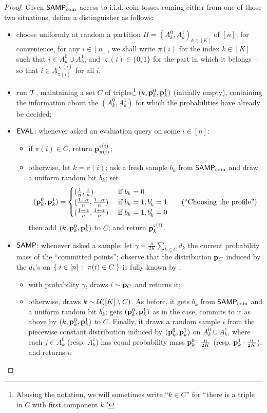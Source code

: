 \begin{proof}
Given ${\sf SAMP}_\text{coin}$ access to i.i.d. coin tosses coming either from one of those two situations, define a distinguisher \Algo as follows:
  \begin{itemize}
    \item choose uniformly at random a partition $\Pi=(A^0_k,A^1_k)_{k\in[K]}$ of $[n]$; for convenience, for any $i\in[n]$, we shall write $\pi(i)$ for the index $k\in[K]$ such that $i\in A^0_k\cup A^1_k$, and $\varsigma(i)\in\{0,1\}$ for the part in which it belongs -- so that $i\in A^{\varsigma(i)}_{\pi(i)}$ for all $i$;
    \item run $\mathcal{T}$, maintaining a set $C$ of triples\footnote{Abusing the notation, we will sometimes write ``$k\in C$'' for ``there is a triple in $C$ with first component $k$.''} $(k, \mathbf{p}^0_k, \mathbf{p}^1_k)$ (initially empty), containing the information about the $(A^0_k,A^1_k)$ for which the probabilities have already be decided;
    \item ${\sf EVAL}$: whenever asked an evaluation query on some $i\in[n]$:
      \begin{itemize}
        \item if $\pi(i)\in C$, return $\mathbf{p}^{\varsigma(i)}_{\pi(i)}$;
        \item otherwise, let $k=\pi(i)$; ask a fresh sample $b_k$ from ${\sf SAMP}_\text{coin}$ and draw a uniform random bit $b_k^\prime$; set
    \[
    (\mathbf{p}^0_k, \mathbf{p}^1_k)=\begin{cases}
      (\frac{1}{n},\frac{1}{n}) & \text{ if } b_k = 0 \\
      (\frac{1+\alpha}{n},\frac{1-\alpha}{n}) & \text{ if } b_k = 1, b^\prime_k = 1 \tag{``Choosing the profile''}\\
      (\frac{1-\alpha}{n},\frac{1+\alpha}{n}) & \text{ if } b_k = 1, b^\prime_k = 0
    \end{cases}\]  
    then add $(k,\mathbf{p}^0_k, \mathbf{p}^1_k)$  to $C$; and return $\mathbf{p}^{\varsigma(i)}_{k}$.
      \end{itemize}
    \item ${\sf SAMP}$: whenever asked a sample: let $\gamma=\frac{n}{2K}\sum_{k\in C} d_k$ the current probability mass of the ``committed points''; observe that the distribution $\mathbf{p}_C$ induced by the $d_k$'s on $\left\{\; i\in[n] \;\colon\; \pi(i)\in C\; \right\}$ is fully known by \Algo;
    \begin{itemize}
      \item with probability $\gamma$, \Algo draws $i\sim \mathbf{p}_C$ and returns it;
      \item otherwise, \Algo draws $k\sim\mathcal{U}\!\left( [K]\setminus C \right) $. As before, it gets $b_k$ from ${\sf SAMP}_\text{coin}$ and a uniform random bit $b_k^\prime$; gets $(\mathbf{p}^0_k, \mathbf{p}^1_k)$ as in the \EVAL case, commits to it as above by $(k,\mathbf{p}^0_k, \mathbf{p}^1_k)$ to $C$. Finally, it draws a random sample $i$ from the piecewise constant distribution induced by  $(\mathbf{p}^0_k, \mathbf{p}^1_k)$ on $A^0_k\cup A^1_k$, where each $j\in A^0_k$ (resp. $A^1_k$) has equal probability mass $\mathbf{p}^0_k\cdot\frac{n}{2K}$ (resp. $\mathbf{p}^1_k\cdot\frac{n}{2K}$), and returns $i$.

\end{itemize}
\end{itemize}
\end{proof}
